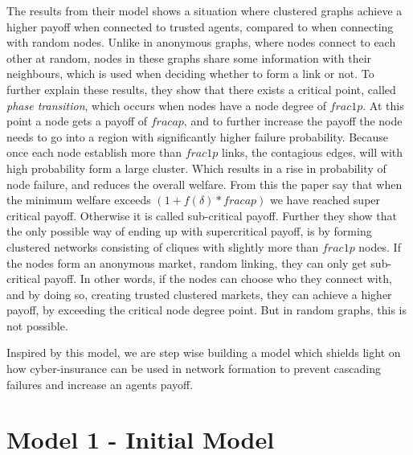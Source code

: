 The results from their model shows a situation where clustered graphs achieve a higher payoff when connected to trusted agents, compared to when connecting with random nodes. Unlike in anonymous graphs, where nodes connect to each other at random, nodes in these graphs share some information with their neighbours, which is used when deciding whether to form a link or not. 
To further explain these results, they show that there exists a critical point, called \textit{phase transition}, which occurs when nodes have a node degree of $frac{1}{p}$. 
At this point a node gets a payoff of $frac{a}{p}$, and to further increase the payoff the node needs to go into a region with significantly higher failure probability. 
Because once each node establish more than $frac{1}{p}$ links, the contagious edges, will with high probability form a large cluster. Which results in a rise in probability of node failure, and reduces the overall welfare.
From this the paper say that when the minimum welfare exceeds 
$(1+f(\delta)*frac{a}{p})$
we have reached super critical payoff. Otherwise it is called sub-critical payoff. 
Further they show that the only possible way of ending up with supercritical payoff, is by forming clustered networks consisting of cliques with slightly more than $frac{1}{p}$ nodes. 
If the nodes form an anonymous market, random linking, they can only get sub-critical payoff. 
In other words, if the nodes can choose who they connect with, and by doing so, creating trusted clustered markets, they can achieve a higher payoff, by exceeding the critical node degree point. But in random graphs, this is not possible. 


Inspired by this model, we are step wise building a model which shields light on how cyber-insurance can be used in network formation to prevent cascading failures and increase an agents payoff.  


\section{Model 1 - Initial Model \label{section:verysimplemodel}}

